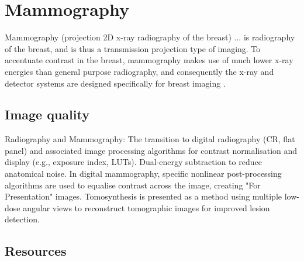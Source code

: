 \chapter{Mammography}

Mammography (projection 2D x-ray radiography of the breast) ... is
radiography of the breast, and is thus a transmission projection type
of imaging. To accentuate contrast in the breast, mammography makes
use of much lower x-ray energies than general purpose radiography, and
consequently the x-ray and detector systems are designed specifically
for breast imaging \cite{bushberg2011essential}.

\section{Image quality}

Radiography and Mammography: The transition to digital radiography
(CR, flat panel) and associated image processing algorithms for
contrast normalisation and display (e.g., exposure index,
LUTs). Dual-energy subtraction to reduce anatomical noise. In digital
mammography, specific nonlinear post-processing algorithms are used to
equalise contrast across the image, creating "For Presentation"
images. Tomosynthesis is presented as a method using multiple low-dose
angular views to reconstruct tomographic images for improved lesion
detection.

\section{Resources}


